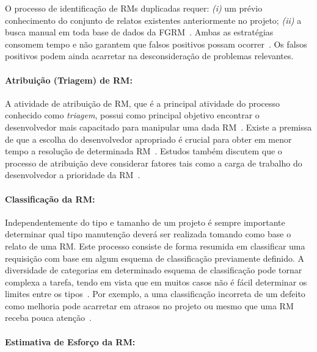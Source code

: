 O processo de identificação de RMs duplicadas requer: \textit{(i)} um prévio
conhecimento do conjunto de relatos existentes anteriormente no projeto;
\textit{(ii)} a busca manual em toda base de dados da
FGRM~\cite{banerjee2012automated,
    Lerch:2013:FDY:2495256.2495763,hindle2016contextual}. Ambas as estratégias
consomem tempo e não garantem que falsos positivos possam
ocorrer~\cite{kaushik2012comparative}. Os falsos positivos podem ainda acarretar
na desconsideração de problemas relevantes.

\paragraph{Atribuição (Triagem) de RM:}

A atividade de atribuição de RM, que é a principal atividade do processo
conhecido como \textit{triagem}, possui como principal objetivo encontrar o
desenvolvedor mais capacitado para manipular uma dada
RM~\cite{cavalcanti2014challenges}. Existe a premissa de que a escolha do
desenvolvedor apropriado é crucial para obter em menor tempo a re\-so\-lu\-ção
de determinada RM~\cite{di2002approach}. Estudos também discutem que o processo
de atribuição deve considerar fatores tais como a carga de trabalho do
desenvolvedor a prioridade da RM~\cite{aljarah2011selecting}.

\paragraph{Classificação da RM:}

Independentemente do tipo e tamanho de um projeto é sempre importante determinar
qual tipo manutenção deverá ser realizada tomando como base o relato de uma
RM\@. Este processo consiste de forma resumida em classificar uma requisição com
base em algum esquema de classificação previamente definido. A diversidade de
categorias em determinado esquema de classificação pode tornar complexa a
tarefa, tendo em vista que em muitos casos não é fácil determinar os limites
entre os tipos~\cite{antoniol2008bug}. Por exemplo, a uma classificação
incorreta de um defeito como melhoria pode acarretar em atrasos no projeto ou
mesmo que uma RM receba pouca atenção~\cite{cavalcanti2014challenges}.

\paragraph{Estimativa de Esforço da RM:}

